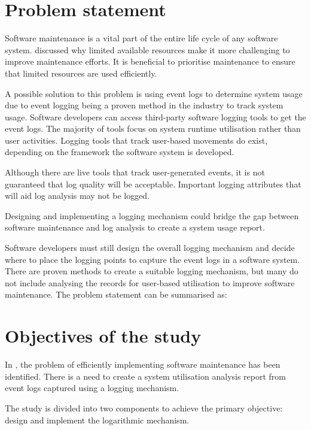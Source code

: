 \section{Problem statement}\label{sec:ch1_problemStatement}
Software maintenance is a vital part of the entire life cycle of any software system.  discussed why limited available resources make it more challenging to improve maintenance efforts. It is beneficial to prioritise maintenance to ensure that limited resources are used efficiently. \par A possible solution to this problem is using event logs to determine system usage due to event logging being a proven method in the industry to track system usage. Software developers can access third-party software logging tools to get the event logs. The majority of tools focus on system runtime utilisation rather than user activities. Logging tools that track user-based movements do exist, depending on the framework the software system is developed. \par Although there are live tools that track user-generated events, it is not guaranteed that log quality will be acceptable. Important logging attributes that will aid log analysis may not be logged. \par Designing and implementing a logging mechanism could bridge the gap between software maintenance and log analysis to create a system usage report. \par Software developers must still design the overall logging mechanism and decide where to place the logging points to capture the event logs in a software system. There are proven methods to create a suitable logging mechanism, but many do not include analysing the records for user-based utilisation to improve software maintenance. The problem statement can be summarised as:

\begin{center}
	\begin{tcolorbox}[colback=lightgray, colframe=black, sharp corners=all, arc=4pt]
		\begin{minipage}{\textwidth}
			\RaggedRight\textit{\problemStatement}
		\end{minipage}
	\end{tcolorbox}
\end{center}

\clearpage

\section{Objectives of the study}\label{sec:ch1_objectives}
In , the problem of efficiently implementing software maintenance has been identified. There is a need to create a system utilisation analysis report from event logs captured using a logging mechanism. \par The study is divided into two components to achieve the primary objective: design and implement the logarithmic mechanism. 

